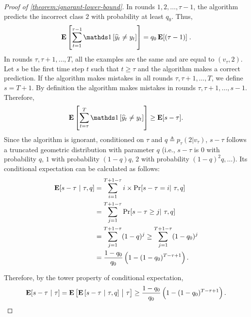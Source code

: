 \begin{proof}[Proof of \autoref{theorem:ignorant-lower-bound}]
In rounds $1,2,\dots,\tau-1$, the algorithm predicts the incorrect class $2$
with probability at least $q_0$. Thus,
\begin{equation}
\Exp\left[\sum_{t=1}^{\tau - 1} \indicator{\widehat y_t\neq y_t}\right] = q_0 \Exp[(\tau - 1)] \; .
\label{eqn:err-phase1}
\end{equation}
In rounds $\tau, \tau+1, \dots, T$, all the examples are the same and are equal
to $(v_\tau, 2)$. Let $s$ be the first time step $t$ such that $t \ge \tau$
and the algorithm makes a correct prediction. If the algorithm makes mistakes
in all rounds $\tau, \tau+1, \dots, T$, we define $s = T+1$.
By definition the algorithm makes mistakes in rounds $\tau, \tau+1, \dots, s-1$.
Therefore,
\begin{equation}
\Exp\left[\sum_{t=\tau}^T \indicator{\widehat y_t\neq y_t}\right] \ge \Exp[s-\tau].
\label{eqn:err-phase2}
\end{equation}
Since the algorithm is ignorant, conditioned on $\tau$ and $q \triangleq p_\tau(2|v_\tau)$, $s-\tau$ follows a truncated geometric distribution with parameter $q$
(i.e., $s-\tau$ is $0$ with probability $q$, $1$ with probability $(1-q)q$, $2$ with probability $(1-q)^2q, \ldots$). Its conditional expectation can be calculated as follows:
\begin{align*}
\operatorname*{\mathbf{E}}[s-\tau~|~\tau, q]
&= \sum_{i=1}^{T+1-\tau} i \times \Pr[s-\tau = i |~\tau, q ] \\
&= \sum_{j=1}^{T+1-\tau}\Pr[s-\tau\geq j | ~\tau, q] \\
& = \sum_{j=1}^{T+1-\tau}(1-q)^j \geq  \sum_{j=1}^{T+1-\tau}(1-q_0)^j \\
& = \frac{1-q_0}{q_0}\left( 1-(1-q_0)^{T-\tau+1} \right).
\end{align*}

Therefore, by the tower property of conditional expectation,
\[ \operatorname*{\mathbf{E}}[s-\tau~|~\tau] = \operatorname*{\mathbf{E}}\left[ \operatorname*{\mathbf{E}}\left[s-\tau~\middle|~\tau, q\right]~ \middle| ~\tau\right] \geq \frac{1-q_0}{q_0}\left( 1-(1-q_0)^{T-\tau+1}\right). \]





\end{proof}
